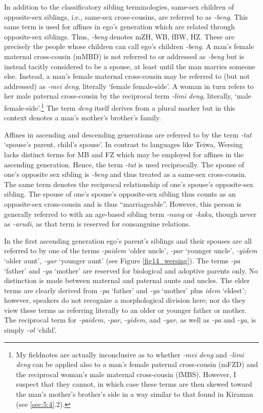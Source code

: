 In addition to the classificatory sibling terminologies, same-sex children of opposite-sex siblings, i.e., same-sex cross-cousins, are referred to as \textit{-beng}. This same term is used for affines in ego's generation which are related through opposite-sex siblings. Thus, \textit{-beng} denotes mZH, WB, fBW, HZ. These are precisely the people whose children can call ego's children \textit{-beng}. A man's female maternal cross-cousin (mMBD) is not referred to or addressed as \textit{-beng} but is instead tacitly considered to be a spouse, at least until the man marries someone else. Instead, a man's female maternal cross-cousin may be referred to (but not addressed) as \textit{-mei deng}, literally `female female-side'. A woman in turn refers to her male paternal cross-cousin by the reciprocal term \textit{-limi deng}, literally, `male female-side'.\footnote{My fieldnotes are actually inconclusive as to whether \textit{-mei deng} and \textit{-limi deng} can be applied also to a man's female paternal cross-cousin (mFZD) and the reciprocal woman's male maternal cross-cousin (fMBS). However, I suspect that they cannot, in which case these terms are then skewed toward the man's mother's brother's side in a way similar to that found in Kiraman (see {\SS} \ref{sec:5:4}.2).}  The term \textit{deng} itself derives from a plural marker but in this context denotes a man's mother's brother's family.

Affines in ascending and descending generations are referred to by the term \textit{-tat} `spouse's parent, child's spouse'. In contrast to languages like Teiwa, Wersing lacks distinct terms for MB and FZ which may be employed for affines in the ascending generation. Hence, the term \textit{-tat} is used reciprocally. The spouse of one's opposite sex sibling is \textit{{}-beng} and thus treated as a same-sex cross-cousin. The same term denotes the reciprocal relationship of one's spouse's opposite-sex sibling. The spouse of one's spouse's opposite-sex sibling thus counts as an opposite-sex cross-cousin and is thus ``marriageable''. However, this person is generally referred to with an age-based sibling term \textit{{}-nang} or \textit{{}-kaku}, though never as \textit{{}-arudi}, as that term is reserved for consanguine relations. 

In the first ascending generation ego's parent's siblings and their spouses are all referred to by one of the terms \textit{-paidem} `older uncle', \textit{-par} `younger uncle', \textit{-yidem} `older aunt', \textit{-yar} `younger aunt' (see Figure \ref{fig14_wersing}). The terms \textit{-pa} `father' and \textit{-ya} `mother' are reserved for biological and adoptive parents only. No distinction is made between maternal and paternal aunts and uncles. The elder terms are clearly derived from \textit{-pa} `father' and \textit{-ya} `mother' plus \textit{idem} `eldest'; however, speakers do not recognize a morphological division here; nor do they view these terms as referring literally to an older or younger father or mother. The reciprocal term for \textit{{}-paidem}, \textit{{}-par}, \textit{{}-yidem}, and \textit{{}-yar}, as well as \textit{-pa} and \textit{{}-ya}, is simply \textit{{}-ol} `child'. 

